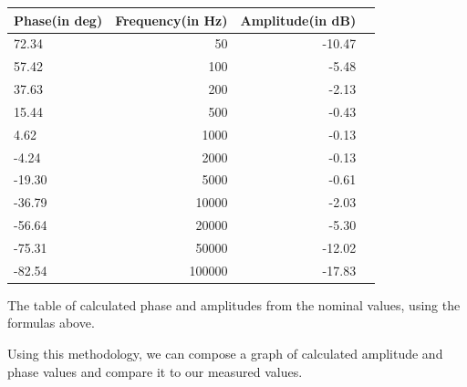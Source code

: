 \begin{adjustwidth}{-2.5 cm}{-2.5 cm}\centering\begin{threeparttable}[!htb]
        \scriptsize
        \begin{tabular}{lrrr}\toprule
            \textbf{Phase(in deg)} & \textbf{Frequency(in Hz)} & \textbf{Amplitude(in dB)} \\\midrule
            72.34                  & 50                        & -10.47                    \\
            57.42                  & 100                       & -5.48                     \\
            37.63                  & 200                       & -2.13                     \\
            15.44                  & 500                       & -0.43                     \\
            4.62                   & 1000                      & -0.13                     \\
            -4.24                  & 2000                      & -0.13                     \\
            -19.30                 & 5000                      & -0.61                     \\
            -36.79                 & 10000                     & -2.03                     \\
            -56.64                 & 20000                     & -5.30                     \\
            -75.31                 & 50000                     & -12.02                    \\
            -82.54                 & 100000                    & -17.83                    \\
            \bottomrule
        \end{tabular}
        \caption{The table of calculated phase and amplitudes from the nominal values, using the formulas above.}
    \end{threeparttable}\end{adjustwidth}

Using this methodology, we can compose a graph of calculated amplitude and phase values and compare it to our measured values.

